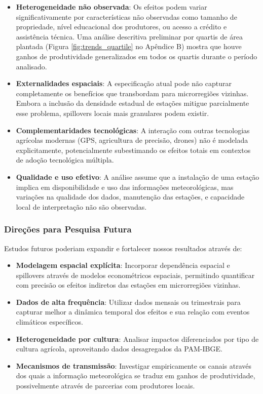 \documentclass[
	12pt,				%
	oneside,			%
	a4paper,			%
	english,			%
	french,				%
	spanish,			%
	brazil				%
	]{abntex2}
\begin{document}
\begin{itemize}
\item \textbf{Heterogeneidade não observada}: Os efeitos podem variar significativamente por características não observadas como tamanho de propriedade, nível educacional dos produtores, ou acesso a crédito e assistência técnica. Uma análise descritiva preliminar por quartis de área plantada (Figura \ref{fig:trends_quartile} no Apêndice B) mostra que houve ganhos de produtividade generalizados em todos os quartis durante o período analisado.

\item \textbf{Externalidades espaciais}: A especificação atual pode não capturar completamente os benefícios que transbordam para microrregiões vizinhas. Embora a inclusão da densidade estadual de estações mitigue parcialmente esse problema, spillovers locais mais granulares podem existir.

\item \textbf{Complementaridades tecnológicas}: A interação com outras tecnologias agrícolas modernas (GPS, agricultura de precisão, drones) não é modelada explicitamente, potencialmente subestimando os efeitos totais em contextos de adoção tecnológica múltipla.

\item \textbf{Qualidade e uso efetivo}: A análise assume que a instalação de uma estação implica em disponibilidade e uso das informações meteorológicas, mas variações na qualidade dos dados, manutenção das estações, e capacidade local de interpretação não são observadas.
\end{itemize}

\subsubsection{Direções para Pesquisa Futura}

Estudos futuros poderiam expandir e fortalecer nossos resultados através de:

\begin{itemize}
\item \textbf{Modelagem espacial explícita}: Incorporar dependência espacial e spillovers através de modelos econométricos espaciais, permitindo quantificar com precisão os efeitos indiretos das estações em microrregiões vizinhas.

\item \textbf{Dados de alta frequência}: Utilizar dados mensais ou trimestrais para capturar melhor a dinâmica temporal dos efeitos e sua relação com eventos climáticos específicos.

\item \textbf{Heterogeneidade por cultura}: Analisar impactos diferenciados por tipo de cultura agrícola, aproveitando dados desagregados da PAM-IBGE.

\item \textbf{Mecanismos de transmissão}: Investigar empiricamente os canais através dos quais a informação meteorológica se traduz em ganhos de produtividade, possivelmente através de parcerias com produtores locais.
\end{itemize}
\end{document}

